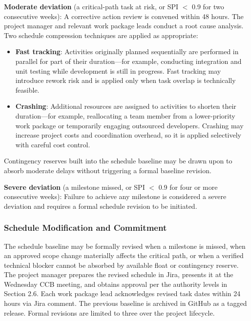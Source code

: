 \documentclass[12pt,a4paper]{article}
\begin{document}
\textbf{Moderate deviation} (a critical-path task at risk, or SPI $<$ 0.9 for two consecutive weeks): A corrective action review is convened within 48 hours. The project manager and relevant work package leads conduct a root cause analysis. Two schedule compression techniques are applied as appropriate:

\begin{itemize}[leftmargin=*]
    \item \textbf{Fast tracking}: Activities originally planned sequentially are performed in parallel for part of their duration---for example, conducting integration and unit testing while development is still in progress. Fast tracking may introduce rework risk and is applied only when task overlap is technically feasible.
    \item \textbf{Crashing}: Additional resources are assigned to activities to shorten their duration---for example, reallocating a team member from a lower-priority work package or temporarily engaging outsourced developers. Crashing may increase project costs and coordination overhead, so it is applied selectively with careful cost control.
\end{itemize}

Contingency reserves built into the schedule baseline may be drawn upon to absorb moderate delays without triggering a formal baseline revision.

\textbf{Severe deviation} (a milestone missed, or SPI $<$ 0.9 for four or more consecutive weeks): Failure to achieve any milestone is considered a severe deviation and requires a formal schedule revision to be initiated.

\subsubsection{Schedule Modification and Commitment}

The schedule baseline may be formally revised when a milestone is missed, when an approved scope change materially affects the critical path, or when a verified technical blocker cannot be absorbed by available float or contingency reserve. The project manager prepares the revised schedule in Jira, presents it at the Wednesday CCB meeting, and obtains approval per the authority levels in Section 2.6. Each work package lead acknowledges revised task dates within 24 hours via Jira comment. The previous baseline is archived in GitHub as a tagged release. Formal revisions are limited to three over the project lifecycle.
\end{document}
